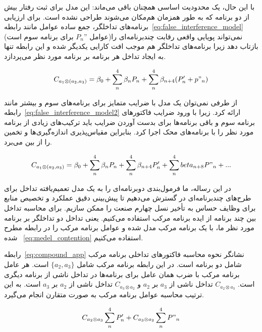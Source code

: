 با این حال، یک محدودیت اساسی همچنان باقی می‌ماند: این مدل برای ثبت رفتار بیش از دو برنامه که به طور همزمان هم‌مکان می‌شوند طراحی نشده است. برای ارزیابی برنامه‌های تداخلگر، جمع ساده عوامل مانند رابطه~\eqref{eq:false_interference_model} (عوامل $P_n”$ برای برنامه سوم است)نمی‌تواند پویایی واقعی رقابت چندبرنامه‌ای را بازتاب دهد زیرا برنامه‌های تداخلگر هم موجب افت کارایی یکدیگر شده و این رابطه تنها به ایجاد تداخل هر برنامه بر برنامه مورد نظر می‌پردازد.

\begin{equation} \label{eq:false_interference_model}
    C_{a_1 \otimes (a_2, a_3)} = \beta_0 + \sum_n^4 \beta_n P_n + \sum_n^4 \beta_{n+4}(P'_n + p"_n)
\end{equation}

از طرفی نمی‌توان یک مدل با ضرایب متمایز برای برنامه‌های سوم و بیشتر مانند رابطه~\eqref{eq:false_interference_model2} ارائه کرد. زیرا با ورود ضرایب فاکتور‌های برنامه سوم و باقی برنامه‌ها برای بدست آوردن ضرایب باید ترکیب‌های زیادی از برنامه مورد نظر را با برنامه‌های محک اجرا کرد. بنابراین مقیاس‌پذیری اندازه‌گیری‌ها و تخمین را از بین می‌برد.

\begin{equation} \label{eq:false_interference_model2}
    C_{a_1 \otimes (a_2, a_3)} = \beta_0 + \sum_n^4 \beta_n P_n + \sum_n^4 \beta_{n+4}P'_n + \sum_n^4 beta_{n+8}P"_n + ...
\end{equation}

در این رساله، ما فرمول‌بندی دوبرنامه‌ای را به یک مدل تعمیم‌یافته تداخل برای طرح‌های چندبرنامه‌ای در  گسترش می‌دهیم تا پیش‌بینی دقیق عملکرد و تخصیص منابع برای وظایف حساس به تأخیر نسل چهارم صنعت را ممکن سازیم. برای محاسبه تداخل بین چند برنامه از ایده برنامه مرکب استفاده می‌کنیم. یعنی تداخل دو تداخلگر بر برنامه مورد نظر ما، با یک برنامه مرکب مدل شده و عوامل برنامه مرکب را در رابطه مطرح شده ~\eqref{eq:medel_contention} استفاده می‌کنیم.

رابطه~\eqref{eq:compound_app} نشانگر نحوه محاسبه فاکتور‌های تداخلی برنامه مرکب شامل دو برنامه است. در این رابطه برنامه مرکب شامل $\{a_2, a_3\}$ است. هر عامل برنامه مرکب با ضرب همان عامل برای برنامه‌ها در تداخل ناشی از برنامه دیگری است. $C_{a_2 \otimes a_3}$ تداخل ناشی از $a_3$ بر $a_2$ و $C_{a_3 \otimes a_2}$ تداخل ناشی از $a_2$ بر $a_3$ است. به این ترتیب محاسبه عوامل برنامه مرکب به صورت متقارن انجام می‌گیرد. 

\begin{equation} \label{eq:compound_app}
    C_{a_2 \otimes a_3} \sum_n^4 P'_n + C_{a_3 \otimes a_2} \sum_n^4 P"_n
\end{equation}

